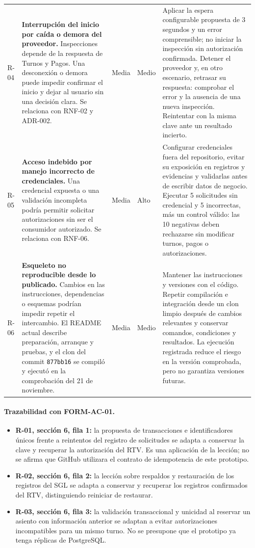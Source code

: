 \documentclass[11pt,a4paper]{article}
\begin{document}
\begin{xltabular}{\textwidth}{lXL{1.1cm}L{1.6cm}L{5cm}}
		R-04 & \textbf{Interrupción del inicio por caída o demora del proveedor.} Inspecciones depende de la respuesta de Turnos y Pagos. Una desconexión o demora puede impedir confirmar el inicio y dejar al usuario sin una decisión clara. Se relaciona con RNF-02 y ADR-002. & Media & Medio & Aplicar la espera configurable propuesta de 3 segundos y un error comprensible; no iniciar la inspección sin autorización confirmada. Detener el proveedor y, en otro escenario, retrasar su respuesta: comprobar el error y la ausencia de una nueva inspección. Reintentar con la misma clave ante un resultado incierto. \\
		R-05 & \textbf{Acceso indebido por manejo incorrecto de credenciales.} Una credencial expuesta o una validación incompleta podría permitir solicitar autorizaciones sin ser el consumidor autorizado. Se relaciona con RNF-06. & Media & Alto & Configurar credenciales fuera del repositorio, evitar su exposición en registros y evidencias y validarlas antes de escribir datos de negocio. Ejecutar 5 solicitudes sin credencial y 5 incorrectas, más un control válido: las 10 negativas deben rechazarse sin modificar turnos, pagos o autorizaciones. \\
		R-06 & \textbf{Esqueleto no reproducible desde lo publicado.} Cambios en las instrucciones, dependencias o esquemas podrían impedir repetir el intercambio. El README actual describe preparación, arranque y pruebas, y el clon del commit \texttt{877bb16} se compiló y ejecutó en la comprobación del 21 de noviembre. & Media & Medio & Mantener las instrucciones y versiones con el código. Repetir compilación e integración desde un clon limpio después de cambios relevantes y conservar comandos, condiciones y resultados. La ejecución registrada reduce el riesgo en la versión comprobada, pero no garantiza versiones futuras. \\
	\end{xltabular}
	
	\paragraph{Trazabilidad con FORM-AC-01.}
	\begin{itemize}[leftmargin=*]
		\item \textbf{R-01, sección 6, fila 1:} la propuesta de transacciones e identificadores únicos frente a reintentos del registro de solicitudes se adapta a conservar la clave y recuperar la autorización del RTV. Es una aplicación de la lección; no se afirma que GitHub utilizara el contrato de idempotencia de este prototipo.
		\item \textbf{R-02, sección 6, fila 2:} la lección sobre respaldos y restauración de los registros del SGL se adapta a conservar y recuperar los registros confirmados del RTV, distinguiendo reiniciar de restaurar.
		\item \textbf{R-03, sección 6, fila 3:} la validación transaccional y unicidad al reservar un asiento con información anterior se adaptan a evitar autorizaciones incompatibles para un mismo turno. No se presupone que el prototipo ya tenga réplicas de PostgreSQL.
	\end{itemize}
	
\end{document}
